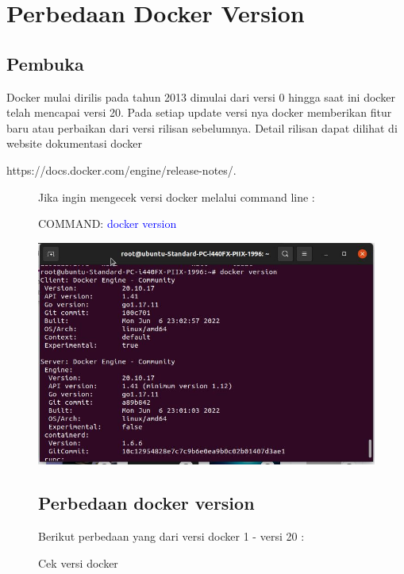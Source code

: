 \chapter{Perbedaan Docker Version}

\section{Pembuka}
Docker mulai dirilis pada tahun 2013 dimulai dari versi 0 hingga saat ini docker telah mencapai versi 20. Pada setiap update versi nya docker memberikan 
fitur baru atau perbaikan dari versi rilisan sebelumnya. Detail rilisan dapat dilihat di website dokumentasi docker 

https://docs.docker.com/engine/release-notes/. 

\begin{figure}
    Jika ingin mengecek versi docker melalui command line : 

    COMMAND: \textcolor{Blue}{docker version}

    \begin{center}
        \includegraphics[width=\linewidth]{image/63.jpg}
        \caption{Cek versi docker}
        \label{fig:my_figure}
    \end{center}

    \section{Perbedaan docker version}
    Berikut perbedaan yang dari versi docker 1 - versi 20 :
\end{figure}

